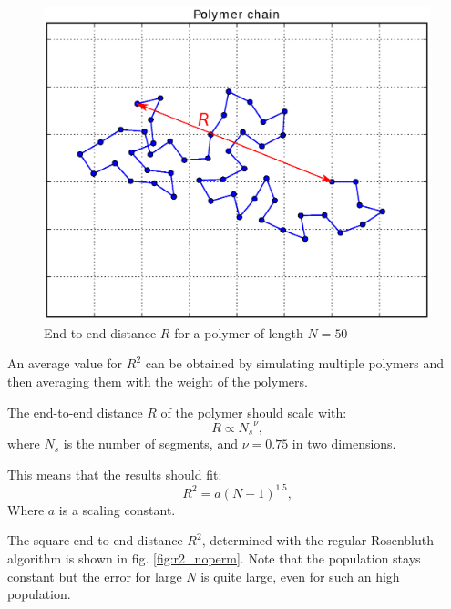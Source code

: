 \documentclass[a4paper,twocolumn]{article}
\begin{document}
\begin{figure}
	\centering
	\includegraphics[width=\linewidth]{end-to-end-distance.eps}
	\caption{End-to-end distance $R$ for a polymer of length $N=50$}
	\label{fig:end-to-end-distance}
\end{figure}

An average value for $R^2$ can be obtained by simulating multiple polymers and then averaging them with the weight of the polymers.

The end-to-end distance $R$ of the polymer should scale with:
\begin{equation}\label{eq:end-to-end}
	R \propto {N_s}^\nu \text{,}
\end{equation}
where $N_s$ is the number of segments, and $\nu = 0.75$ in two dimensions.\cite{thijssen}

This means that the results should fit:
\begin{equation}\label{eq:end-to-end-sq}
	R^2 = a(N-1)^{1.5} \text{,}
\end{equation}
Where $a$ is a scaling constant.

The square end-to-end distance $R^2$, determined with the regular Rosenbluth algorithm is shown in fig. \ref{fig:r2_noperm}. Note that the population stays constant but the error for large $N$ is quite large, even for such an high population.
\end{document}
